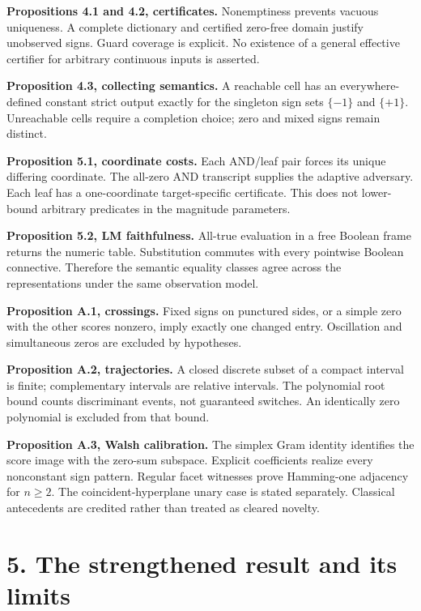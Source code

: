 \documentclass[
  11pt,
]{article}
\begin{document}
\textbf{Propositions 4.1 and 4.2, certificates.} Nonemptiness prevents
vacuous uniqueness. A complete dictionary and certified zero-free domain
justify unobserved signs. Guard coverage is explicit. No existence of a
general effective certifier for arbitrary continuous inputs is asserted.

\textbf{Proposition 4.3, collecting semantics.} A reachable cell has an
everywhere-defined constant strict output exactly for the singleton sign
sets \(\{-1\}\) and \(\{+1\}\). Unreachable cells require a completion
choice; zero and mixed signs remain distinct.

\textbf{Proposition 5.1, coordinate costs.} Each AND/leaf pair forces
its unique differing coordinate. The all-zero AND transcript supplies
the adaptive adversary. Each leaf has a one-coordinate target-specific
certificate. This does not lower-bound arbitrary predicates in the
magnitude parameters.

\textbf{Proposition 5.2, LM faithfulness.} All-true evaluation in a free
Boolean frame returns the numeric table. Substitution commutes with
every pointwise Boolean connective. Therefore the semantic equality
classes agree across the representations under the same observation
model.

\textbf{Proposition A.1, crossings.} Fixed signs on punctured sides, or
a simple zero with the other scores nonzero, imply exactly one changed
entry. Oscillation and simultaneous zeros are excluded by hypotheses.

\textbf{Proposition A.2, trajectories.} A closed discrete subset of a
compact interval is finite; complementary intervals are relative
intervals. The polynomial root bound counts discriminant events, not
guaranteed switches. An identically zero polynomial is excluded from
that bound.

\textbf{Proposition A.3, Walsh calibration.} The simplex Gram identity
identifies the score image with the zero-sum subspace. Explicit
coefficients realize every nonconstant sign pattern. Regular facet
witnesses prove Hamming-one adjacency for \(n\ge2\). The
coincident-hyperplane unary case is stated separately. Classical
antecedents are credited rather than treated as cleared novelty.

\section{5. The strengthened result and its
limits}\label{the-strengthened-result-and-its-limits}
\end{document}
